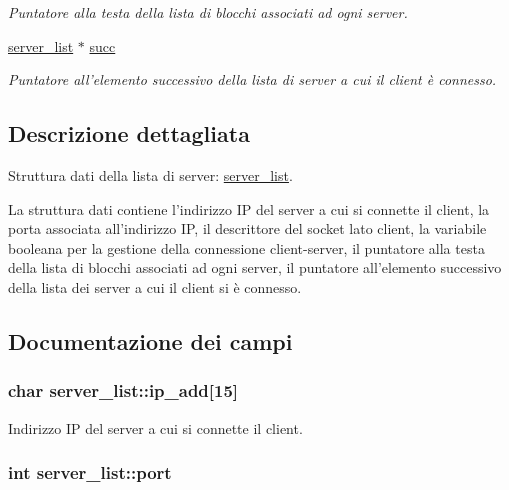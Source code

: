 \begin{CompactItemize}
\begin{CompactList}\small\item\em Puntatore alla testa della lista di blocchi associati ad ogni server. \item\end{CompactList}\item 
\hyperlink{structserver__list}{server\_\-list} $\ast$ \hyperlink{structserver__list_64bb0479e5e9c0e84bef62534b40495b_64bb0479e5e9c0e84bef62534b40495b}{succ}
\begin{CompactList}\small\item\em Puntatore all'elemento successivo della lista di server a cui il client è connesso. \item\end{CompactList}\end{CompactItemize}


\subsection{Descrizione dettagliata}
Struttura dati della lista di server: \hyperlink{structserver__list}{server\_\-list}. 

La struttura dati contiene l'indirizzo IP del server a cui si connette il client, la porta associata all'indirizzo IP, il descrittore del socket lato client, la variabile booleana per la gestione della connessione client-server, il puntatore alla testa della lista di blocchi associati ad ogni server, il puntatore all'elemento successivo della lista dei server a cui il client si è connesso. 

\subsection{Documentazione dei campi}
\hypertarget{structserver__list_ecade329fa4773018ee94fa73ee43d8e_ecade329fa4773018ee94fa73ee43d8e}{
\subsubsection[{ip\_\-add}]{\setlength{\rightskip}{0pt plus 5cm}char {\bf server\_\-list::ip\_\-add}\mbox{[}15\mbox{]}}}
\label{structserver__list_ecade329fa4773018ee94fa73ee43d8e_ecade329fa4773018ee94fa73ee43d8e}


Indirizzo IP del server a cui si connette il client. 

\hypertarget{structserver__list_bb30850b4352cd990f913320d7e243b4_bb30850b4352cd990f913320d7e243b4}{
\subsubsection[{port}]{\setlength{\rightskip}{0pt plus 5cm}int {\bf server\_\-list::port}}}
\label{structserver__list_bb30850b4352cd990f913320d7e243b4_bb30850b4352cd990f913320d7e243b4}


